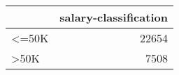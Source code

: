 \begin{tabular}{lr}
\toprule
{} &  salary-classification \\
\midrule
 <=50K &                  22654 \\
 >50K  &                   7508 \\
\bottomrule
\end{tabular}
